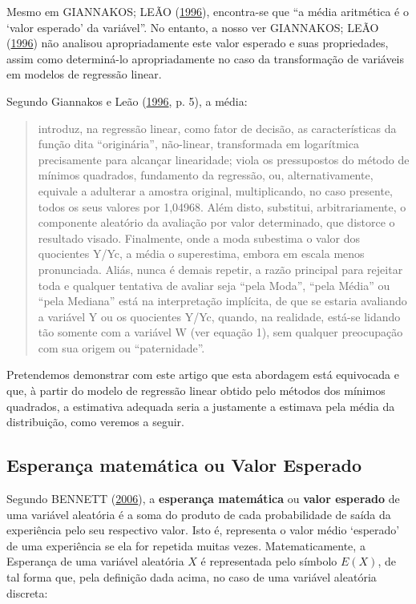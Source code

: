 \documentclass[a4paper]{article}
\begin{document}
Mesmo em GIANNAKOS; LEÃO (\protect\hyperlink{ref-giannakos}{1996}),
encontra-se que ``a média aritmética é o `valor esperado' da variável''.
No entanto, a nosso ver GIANNAKOS; LEÃO
(\protect\hyperlink{ref-giannakos}{1996}) não analisou apropriadamente
este valor esperado e suas propriedades, assim como determiná-lo
apropriadamente no caso da transformação de variáveis em modelos de
regressão linear.

Segundo Giannakos e Leão (\protect\hyperlink{ref-giannakos}{1996}, p.
5), a média:

\begin{quote}
introduz, na regressão linear, como fator de decisão, as características
da função dita ``originária'', não-linear, transformada em logarítmica
precisamente para alcançar linearidade; viola os pressupostos do método
de mínimos quadrados, fundamento da regressão, ou, alternativamente,
equivale a adulterar a amostra original, multiplicando, no caso
presente, todos os seus valores por 1,04968. Além disto, substitui,
arbitrariamente, o componente aleatório da avaliação por valor
determinado, que distorce o resultado visado. Finalmente, onde a moda
subestima o valor dos quocientes Y/Yc, a média o superestima, embora em
escala menos pronunciada. Aliás, nunca é demais repetir, a razão
principal para rejeitar toda e qualquer tentativa de avaliar seja ``pela
Moda'', ``pela Média'' ou ``pela Mediana'' está na interpretação
implícita, de que se estaria avaliando a variável Y ou os quocientes
Y/Yc, quando, na realidade, está-se lidando tão somente com a variável W
(ver equação 1), sem qualquer preocupação com sua origem ou
``paternidade''.
\end{quote}

Pretendemos demonstrar com este artigo que esta abordagem está
equivocada e que, à partir do modelo de regressão linear obtido pelo
métodos dos mínimos quadrados, a estimativa adequada seria a justamente
a estimava pela média da distribuição, como veremos a seguir.

\subsection{Esperança matemática ou Valor
Esperado}\label{esperanca-matematica-ou-valor-esperado}

Segundo BENNETT (\protect\hyperlink{ref-bennett}{2006}), a
\textbf{esperança matemática} ou \textbf{valor esperado } de uma
variável aleatória é a soma do produto de cada probabilidade de saída da
experiência pelo seu respectivo valor. Isto é, representa o valor médio
`esperado' de uma experiência se ela for repetida muitas vezes.
Matematicamente, a Esperança de uma variável aleatória \(X\) é
representada pelo símbolo \(E(X)\), de tal forma que, pela definição
dada acima, no caso de uma variável aleatória discreta:
\end{document}
